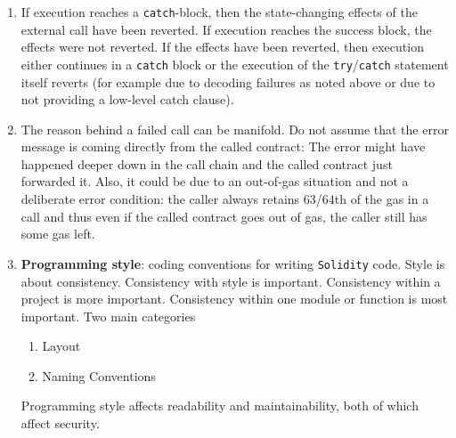 \begin{enumerate}
\item If execution reaches a \verb|catch|-block, then the state-changing effects of the external call have been reverted. If execution reaches the success block, the effects were not reverted. If the effects have been reverted, then execution either continues in a \verb|catch| block or the execution of the \verb|try|/\verb|catch| statement itself reverts (for example due to decoding failures as noted above or due to not providing a low-level catch clause).

\item The reason behind a failed call can be manifold. Do not assume that the error message is coming directly from the called contract: The error might have happened deeper down in the call chain and the called contract just forwarded it. Also, it could be due to an out-of-gas situation and not a deliberate error condition: the caller always retains 63/64th of the gas in a call and thus even if the called contract goes out of gas, the caller still has some gas left.

\item\textbf{Programming style}: coding conventions for writing \verb|Solidity| code. Style is about consistency. Consistency with style is important. Consistency within a project is more important. Consistency within one module or function is most important. Two main categories
    \begin{enumerate}
    \item Layout
    \item Naming Conventions
    \end{enumerate}
Programming style affects readability and maintainability, both of which affect security.


\end{enumerate}
